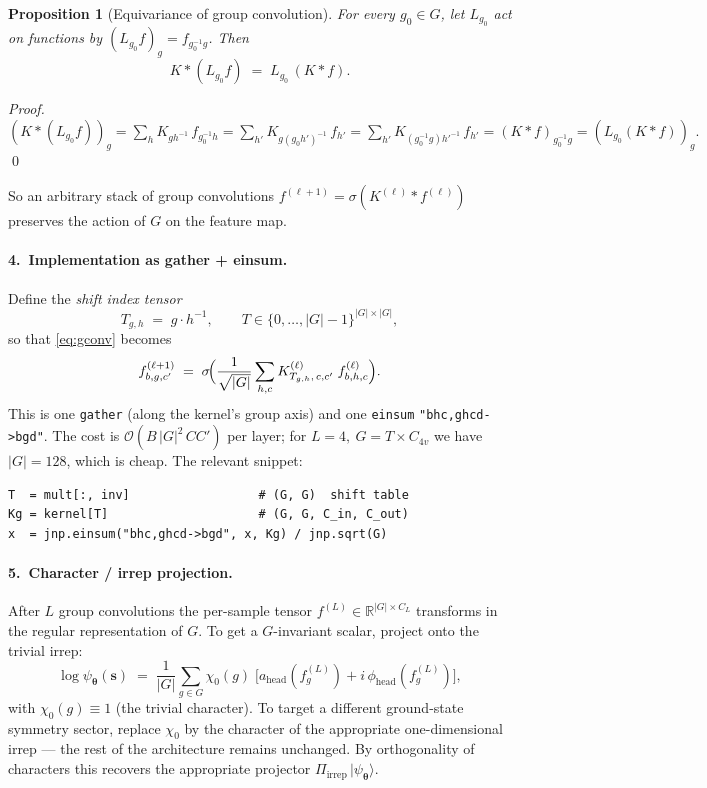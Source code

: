 \documentclass[11pt,a4paper]{article}
\newcommand{\R}{\mathbb{R}}
\newcommand{\bs}{\bm{s}}
\newcommand{\btheta}{\bm{\theta}}
\newcommand{\psip}{\psi_{\btheta}}
\theoremstyle{definition}
\theoremstyle{plain}
\newtheorem{proposition}{Proposition}
\begin{document}
\begin{proposition}[Equivariance of group convolution]
For every $g_{0}\in G$, let $L_{g_{0}}$ act on functions by $(L_{g_{0}} f)_{g} = f_{g_{0}^{-1}g}$. Then
\begin{equation}
   K * (L_{g_{0}} f) \;=\; L_{g_{0}}\,(K * f).
\end{equation}
\end{proposition}
\begin{proof}
$(K * (L_{g_{0}}f))_{g} = \sum_{h} K_{gh^{-1}}\, f_{g_{0}^{-1}h}
= \sum_{h'} K_{g(g_{0}h')^{-1}}\, f_{h'}
= \sum_{h'} K_{(g_{0}^{-1}g)h'^{-1}}\, f_{h'}
= (K*f)_{g_{0}^{-1}g} = (L_{g_{0}}(K*f))_{g}.$ \qed
\end{proof}
So an arbitrary stack of group convolutions $f^{(\ell+1)} = \sigma(K^{(\ell)} * f^{(\ell)})$
preserves the action of $G$ on the feature map.

\paragraph{4.\ Implementation as gather + einsum.}
Define the \emph{shift index tensor}
\begin{equation}
   T_{g, h} \;=\; g\cdot h^{-1}, \qquad T \in \{0,\dots,|G|-1\}^{|G|\times|G|},
\end{equation}
so that \eqref{eq:gconv} becomes
\begin{equation}
   f^{(\ell+1)}_{b,g,c'}
   \;=\; \sigma\!\Bigl(
         \frac{1}{\sqrt{|G|}}\sum_{h, c} K^{(\ell)}_{T_{g,h},\, c, c'}\;
                                          f^{(\ell)}_{b, h, c}\Bigr).
\end{equation}
This is one \texttt{gather} (along the kernel's group axis) and one
\texttt{einsum} \verb|"bhc,ghcd->bgd"|. The cost is
$\mathcal O(B\,|G|^{2}\,C C')$ per layer; for $L=4,\ G = T\times C_{4v}$ we
have $|G| = 128$, which is cheap. The relevant snippet:
\begin{lstlisting}
T  = mult[:, inv]                  # (G, G)  shift table
Kg = kernel[T]                     # (G, G, C_in, C_out)
x  = jnp.einsum("bhc,ghcd->bgd", x, Kg) / jnp.sqrt(G)
\end{lstlisting}

\paragraph{5.\ Character / irrep projection.}
After $L$ group convolutions the per-sample tensor $f^{(L)} \in \R^{|G|\times C_{L}}$
transforms in the regular representation of $G$. To get a $G$-invariant
scalar, project onto the trivial irrep:
\begin{equation}
   \log\psip(\bs)
   \;=\;
   \frac{1}{|G|} \sum_{g\in G} \chi_{0}(g)\;
   \bigl[a_{\text{head}}(f^{(L)}_{g}) + i\,\phi_{\text{head}}(f^{(L)}_{g})\bigr],
\end{equation}
with $\chi_{0}(g)\equiv 1$ (the trivial character). To target a different
ground-state symmetry sector, replace $\chi_{0}$ by the character of the
appropriate one-dimensional irrep --- the rest of the architecture remains
unchanged. By orthogonality of characters this recovers the appropriate
projector $\Pi_{\text{irrep}}\,|\psip\rangle$.
\end{document}
